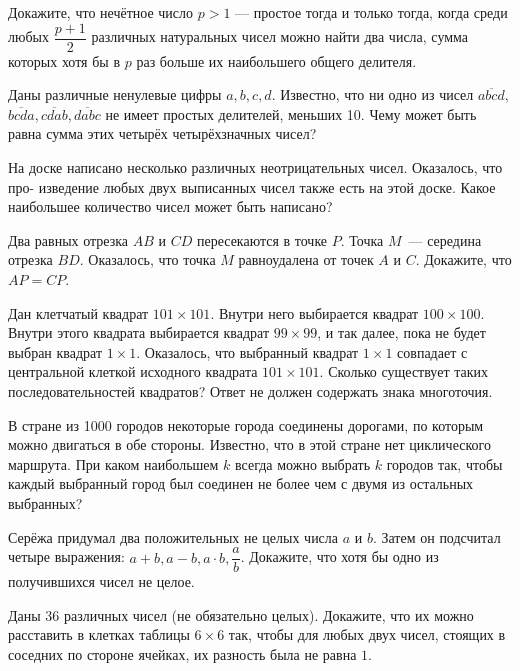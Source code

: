 \documentclass{article}
\begin{document}
\begin{enumerate_boxed}
        \item Докажите, что нечётное число $p > 1$ — простое тогда и только тогда, когда среди любых $\dfrac{p+1}{2}$ различных натуральных чисел можно найти два числа, сумма которых хотя бы в $p$ раз больше их наибольшего общего делителя.


        \item Даны различные ненулевые цифры $a, b, c, d$.
        Известно, что ни одно из чисел $\overline{abcd}$, $\overline{bcda}, \overline{cdab}, \overline{dabc}$ не имеет простых делителей, меньших 10.
        Чему может быть равна сумма этих четырёх четырёхзначных чисел?

        \item На доске написано несколько различных неотрицательных чисел.
        Оказалось, что про- изведение любых двух выписанных чисел также есть на этой доске.
        Какое наибольшее количество чисел может быть написано?

        \item Два равных отрезка $AB$ и $CD$ пересекаются в точке $P$.
        Точка $M$~--- середина отрезка $BD$.
        Оказалось, что точка $M$ равноудалена от точек $A$ и $C$.
        Докажите, что $AP = CP$.

        \item Дан клетчатый квадрат $101\times 101$.
        Внутри него выбирается квадрат $100\times 100$.
        Внутри этого квадрата выбирается квадрат $99 \times 99$, и так далее, пока не будет выбран квадрат $1\times 1$.
        Оказалось, что выбранный квадрат $1\times1$ совпадает с центральной клеткой исходного квадрата $101 \times 101$.
        Сколько существует таких последовательностей квадратов?
        Ответ не должен содержать знака многоточия.

        \item В стране из 1000 городов некоторые города соединены дорогами, по которым можно двигаться в обе стороны.
        Известно, что в этой стране нет циклического маршрута.
        При каком наибольшем $k$ всегда можно выбрать $k$ городов так, чтобы каждый выбранный город был соединен не более чем с двумя из остальных выбранных?

        \item Серёжа придумал два положительных не целых числа $a$ и $b$.
        Затем он подсчитал четыре выражения: $a+b, a-b, a\cdot b, \dfrac{a}{b}$.
        Докажите, что хотя бы одно из получившихся чисел не целое.

        \item Даны $36$ различных чисел (не обязательно целых).
        Докажите, что их можно расставить в клетках таблицы $6 \times 6$ так, чтобы для любых двух чисел, стоящих в соседних по стороне ячейках, их разность была не равна $1$.


\end{enumerate_boxed}
\end{document}
